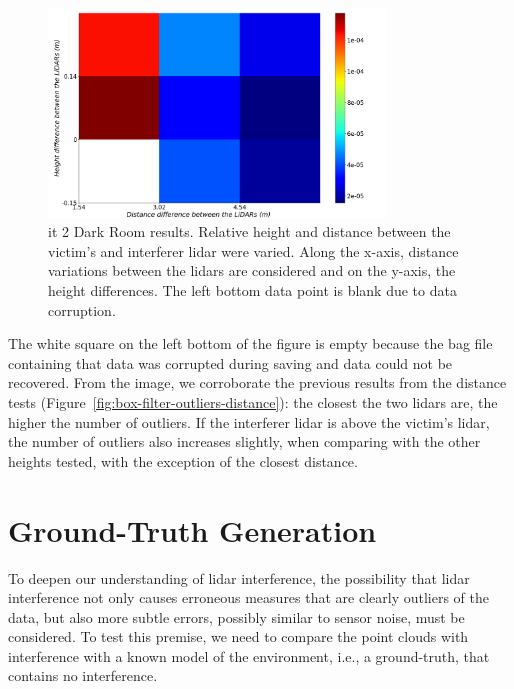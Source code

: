\begin{figure}[!ht]
\centering
\includegraphics[width=0.8\textwidth]{img/lidar-interference/box-filtering/interference-box-filter-outliers-it2.png}
\caption[Relative number of outliers when the distance and height between the \acsp{lidar} are varied on \acs{it} 2 Dark Room.]{\ac{it} 2 Dark Room results. Relative height and distance between the victim's and interferer \ac{lidar} were varied. Along the x-axis, distance variations between the \acp{lidar} are considered and on the y-axis, the height differences. The left bottom data point is blank due to data corruption.}
\label{fig:box-filter-outliers-it2}
\end{figure}

The white square on the left bottom of the figure is empty because the bag file containing that data was corrupted during saving and data could not be recovered. From the image, we corroborate the previous results from the distance tests (Figure~\ref{fig:box-filter-outliers-distance}): the closest the two \acp{lidar} are, the higher the number of outliers. If the interferer \ac{lidar} is above the victim's \ac{lidar}, the number of outliers also increases slightly, when comparing with the other heights tested, with the exception of the closest distance.





\section{Ground-Truth Generation}
\label{sec:lidar-interference:ground-truth-generation}
To deepen our understanding of \ac{lidar} interference, the possibility that \ac{lidar} interference not only causes erroneous measures that are clearly outliers of the data, but also more subtle errors, possibly similar to sensor noise, must be considered. To test this premise, we need to compare the point clouds with interference with a known model of the environment, i.e., a ground-truth, that contains no interference.  

